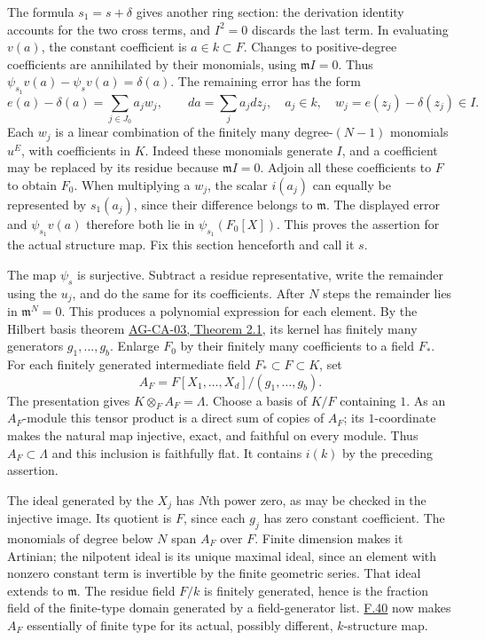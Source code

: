 \documentclass[11pt,a4paper,openany]{report}
\begin{document}
The formula \(s_1=s+\delta\) gives another ring section: the derivation identity accounts for the two cross terms, and \(I^2=0\) discards the last term. In evaluating \(v(a)\), the constant coefficient is \(a\in k\subset F\). Changes to positive-degree coefficients are annihilated by their monomials, using \(\mathfrak m I=0\). Thus \(\psi_{s_1}v(a)-\psi_s v(a)=\delta(a)\). The remaining error has the form \[
e(a)-\delta(a)=\sum_{j\in J_0}a_j w_j,
\qquad da=\sum_j a_j dz_j,\quad a_j\in k,
\quad w_j=e(z_j)-\delta(z_j)\in I.
\] Each \(w_j\) is a linear combination of the finitely many degree-\((N-1)\) monomials \(u^E\), with coefficients in \(K\). Indeed these monomials generate \(I\), and a coefficient may be replaced by its residue because \(\mathfrak m I=0\). Adjoin all these coefficients to \(F\) to obtain \(F_0\). When multiplying a \(w_j\), the scalar \(i(a_j)\) can equally be represented by \(s_1(a_j)\), since their difference belongs to \(\mathfrak m\). The displayed error and \(\psi_{s_1}v(a)\) therefore both lie in \(\psi_{s_1}(F_0[X])\). This proves the assertion for the actual structure map. Fix this section henceforth and call it \(s\).

The map \(\psi_s\) is surjective. Subtract a residue representative, write the remainder using the \(u_j\), and do the same for its coefficients. After \(N\) steps the remainder lies in \(\mathfrak m^N=0\). This produces a polynomial expression for each element. By the Hilbert basis theorem \href{https://github.com/KokunoYumeto/open-math-courses/blob/d02d0a3669f42579db037cd44de1d113fdd770a1/docs/courses/AG-CA/src/noetherian-and-artinian-rings.md}{AG-CA-03, Theorem 2.1}, its kernel has finitely many generators \(g_1,\ldots,g_b\). Enlarge \(F_0\) by their finitely many coefficients to a field \(F_*\). For each finitely generated intermediate field \(F_*\subset F\subset K\), set \[
A_F=F[X_1,\ldots,X_d]/(g_1,\ldots,g_b).
\] The presentation gives \(K\otimes_F A_F=\Lambda\). Choose a basis of \(K/F\) containing \(1\). As an \(A_F\)-module this tensor product is a direct sum of copies of \(A_F\); its \(1\)-coordinate makes the natural map injective, exact, and faithful on every module. Thus \(A_F\subset\Lambda\) and this inclusion is faithfully flat. It contains \(i(k)\) by the preceding assertion.

The ideal generated by the \(X_j\) has \(N\)th power zero, as may be checked in the injective image. Its quotient is \(F\), since each \(g_j\) has zero constant coefficient. The monomials of degree below \(N\) span \(A_F\) over \(F\). Finite dimension makes it Artinian; the nilpotent ideal is its unique maximal ideal, since an element with nonzero constant term is invertible by the finite geometric series. That ideal extends to \(\mathfrak m\). The residue field \(F/k\) is finitely generated, hence is the fraction field of the finite-type domain generated by a field-generator list. \hyperref[AG-RG-S05-algebra-lemma-essentially-of-finite-type-into-artinian-local]{F.40} now makes \(A_F\) essentially of finite type for its actual, possibly different, \(k\)-structure map.
\end{document}
